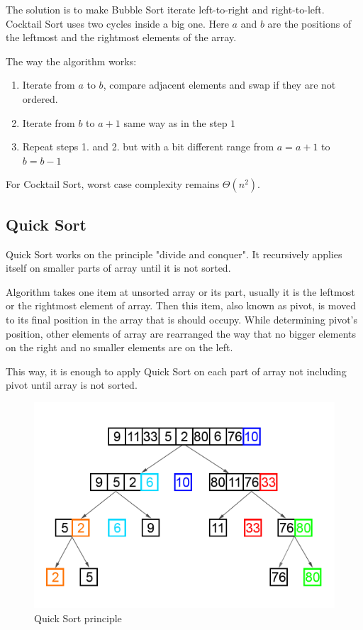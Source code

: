 \documentclass[
  field=inf,
  biblatex,
  language=english,
  glossaries,
  theorems=false,
  sourcecodes=false,
  index
]{kidiplom}
\begin{document}
The solution is to make Bubble Sort iterate left-to-right and right-to-left. Cocktail Sort uses two cycles inside a big one. Here $a$ and $b$ are the positions of the leftmost and the rightmost elements of the array.

The way the algorithm works:

\begin{enumerate}
 \item Iterate from $a$ to $b$, compare adjacent elements and swap if they are not ordered.
 \item Iterate from $b$ to $a + 1$ same way as in the step $1$
 \item Repeat steps 1. and 2. but with a bit different range from $a = a + 1$ to $b = b - 1$
\end{enumerate}

For Cocktail Sort, worst case complexity remains $\Theta(n^2)$.

\subsection{Quick Sort}
\label{sec:quicksort}
Quick Sort works on the principle "divide and conquer". It recursively applies itself on smaller parts of array until it is not sorted.

Algorithm takes one item at unsorted array or its part, usually it is the leftmost or the rightmost element of array. Then this item, also known as pivot, is moved to its final position in the array that is should occupy. While determining pivot's position, other elements of array are rearranged the way that no bigger elements on the right and no smaller elements are on the left.

This way, it is enough to apply Quick Sort on each part of array not including pivot until array is not sorted.

\begin{figure}[H]
\begin{center}
	
	\includegraphics[scale=0.35]{img/Quicksort.png}
	\caption{Quick Sort principle}\label{fig:insert}
\end{center}
\end{figure}
\end{document}
